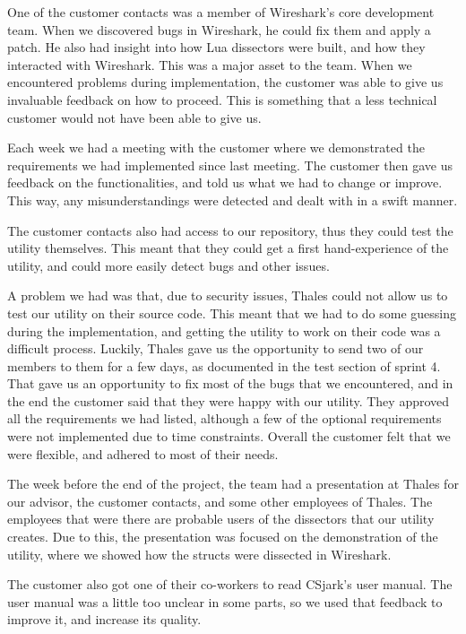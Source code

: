 One of the customer contacts was a member of Wireshark's core development team. When we discovered bugs in Wireshark, he could fix them and apply a patch. He also had insight into how 
Lua dissectors were built, and how they interacted with Wireshark. This was a major asset to the team. When we encountered problems during implementation, the customer was able to give us invaluable feedback on how to proceed. This is something that a less technical customer would not have been able to give us.

Each week we had a meeting with the customer where we demonstrated the requirements we had implemented since last meeting. The customer then gave us feedback on the functionalities, and told us what we had to change or improve. This way, any misunderstandings were detected and dealt with in a swift manner.

The customer contacts also had access to our repository, thus they could test the utility themselves.
This meant that they could get a first hand-experience of the utility, and could more easily detect bugs and other issues.	

A problem we had was that, due to security issues, Thales could not allow us to test our utility on their source code. This meant that we had to do some guessing during the implementation, and getting the utility to work on their code was a difficult process. Luckily, Thales gave us the opportunity to send two of our members to them for a few days, as documented in the test section of sprint 4. That gave us an opportunity to fix most of the bugs that we encountered, and in the end the customer said that they were happy with our utility. They approved all the requirements we had listed, although a few of the optional requirements were not implemented due to time constraints.
Overall the customer felt that we were flexible, and adhered to most of their needs.

The week before the end of the project, the team had a presentation at Thales for our advisor, the customer contacts, and some other employees of Thales. The employees that were there are probable users of the dissectors that our utility creates. Due to this, the presentation was focused on the demonstration of the utility, where we showed how the structs were dissected in Wireshark.

The customer also got one of their co-workers to read CSjark's user manual.
The user manual was a little too unclear in some parts, so we used that feedback to improve it, and increase its quality.

